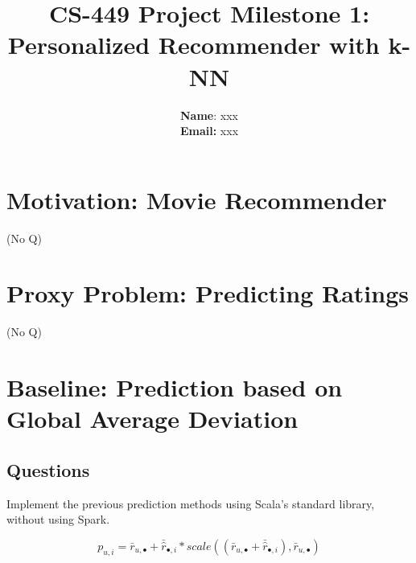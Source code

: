\documentclass{article}
\title{CS-449 Project Milestone 1: Personalized Recommender with k-NN}
\author{
\textbf{Name}: xxx\\
\textbf{Email:} xxx\\
}
\begin{document}
\maketitle

\section{Motivation: Movie Recommender}
(No Q)
\section{Proxy Problem: Predicting Ratings}
(No Q)

\section{Baseline: Prediction based on Global Average Deviation}
\subsection{Questions}
\label{section:q1}

Implement the previous prediction methods using Scala's standard library, without using Spark.

\begin{equation}
    \label{eq:baseline}
    p_{u,i} = \bar r_{u,\bullet} + \bar{\hat r}_{\bullet,i} * scale( (\bar r_{u,\bullet} + \bar{\hat r}_{\bullet,i}), \bar r_{u,\bullet})
\end{equation}
  
\end{document}
